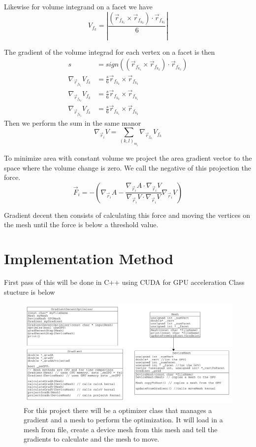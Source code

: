 \documentclass[]{article}
\begin{document}
Likewise for volume integrand on a facet we have
$$V_{f_{k}} = \left|\frac{(\vec{r}_{f_{k_1}} \times \vec{r}_{f_{k_2}}) \cdot \vec{r}_{f_{k_3}}}{6}\right|$$

The gradient of the volume integrad for each vertex on a facet is then
\begin{align}
s &= sign((\vec{r}_{f_{k_1}} \times \vec{r}_{f_{k_2}}) \cdot \vec{r}_{f_{k_3}})\\
\nabla_{\vec{r}_{f_{k_1}}}V_{f_k} &=\frac{s}{6}\vec{r}_{f_{k_2}} \times \vec{r}_{f_{k_3}}\\
\nabla_{\vec{r}_{f_{k_2}}}V_{f_k} &=\frac{s}{6}\vec{r}_{f_{k_3}} \times \vec{r}_{f_{k_1}}\\
\nabla_{\vec{r}_{f_{k_3}}}V_{f_k} &=\frac{s}{6}\vec{r}_{f_{k_1}} \times \vec{r}_{f_{k_2}}
\end{align}
Then we perform the sum in the same manor 
$$\nabla_{\vec{r}_i} V = \sum_{(k,l)_{m_i}} \nabla_{\vec{r}_{f_{k_l}}}V_{f_k}$$

To minimize area with constant volume we project the area gradient vector to the space where the volume change is zero. We call the negative of this projection the force. 
$$ \vec{F}_i = -\left(\nabla_{\vec{r}_i} A - \frac{\nabla_{\vec{r}_i} A \cdot \nabla_{\vec{r}_i} V}{\nabla_{\vec{r}_i} V \cdot \nabla_{\vec{r}_i} V}\nabla_{\vec{r}_i} V\right)$$

Gradient decent then consists of calculating this force and moving the vertices on the mesh until the force is below a threshold value. 

\section{Implementation Method}
First pass of this will be done in C++ using CUDA for GPU acceleration Class stucture is below
\begin{figure}[h]
	\centering
	\includegraphics[width=1\linewidth]{Classes}
	\caption[Class Diagram]{For this project there will be a optimizer class that manages a gradient and a mesh to perform the optimization. It will load in a mesh from file, create a device mesh from this mesh and tell the gradients to calculate and the mesh to move.}
	\label{fig:classes}
\end{figure}
\end{document}
